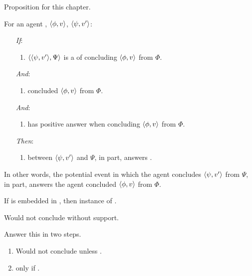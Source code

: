 \begin{note}
  Proposition for this chapter.

  \begin{proposition}
    \label{prop:fc-answers-why}
    For an agent \vAgent{}, \(\langle \phi, v \rangle\), \(\langle \psi, v' \rangle\):

    \begin{enumerate}
    \item[\emph{If}:]
      \begin{enumerate}[label=\alph*., ref=(\alph*)]
      \item \(\langle \langle \psi, v' \rangle, \Psi \rangle\) is a \requ{} of concluding \(\langle \phi, v \rangle\) from \(\Phi\).
      \end{enumerate}
    \item[\emph{And}:]
      \begin{enumerate}[label=\alph*., ref=(\alph*), resume]
      \item
        \vAgent{} concluded \(\langle \phi, v \rangle\) from \(\Phi\).
      \end{enumerate}
    \item[\emph{And}:]
      \begin{enumerate}[label=\alph*., ref=(\alph*), resume]
      \item
        \qzS{} has positive answer when concluding \(\langle \phi, v \rangle\) from \(\Phi\).
      \end{enumerate}
    \item[\emph{Then}:]
      \begin{enumerate}[label=\alph*., ref=(\alph*), resume]
      \item {} between \(\langle \psi, v' \rangle\) and \(\Psi\), in part, answers \qWhyV{}.
      \end{enumerate}
    \end{enumerate}
  \end{proposition}
  In other words, the potential event in which the agent concludes \(\langle \psi, v' \rangle\) from \(\Psi\), in part, answers \qWhyV{} the agent concluded \(\langle \phi, v \rangle\) from \(\Phi\).
\end{note}

\begin{note}
  \begin{proposition}
    If \fc{} is embedded in \support{}, then instance of \qzS{}.
  \end{proposition}
\end{note}

\begin{note}
  Would not conclude without support.

  Answer this in two steps.
  \begin{enumerate}
  \item
    Would not conclude unless \fc{}.
  \item
    \fc{} only if \support{}.
  \end{enumerate}
\end{note}

